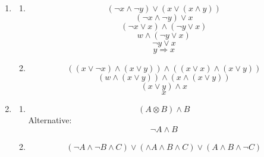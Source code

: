 \documentclass[a4paper]{article}
\begin{document}
\begin{enumerate}
		\item
		\begin{enumerate}
			\item
			\begin{equation*}
				(\lnot x \land \lnot y) \lor (x \lor (x \land y))
			\end{equation*}
			\begin{equation*}
				(\lnot x \land \lnot y) \lor x
			\end{equation*}
			\begin{equation*}
				(\lnot x \lor x) \land (\lnot y \lor x)
			\end{equation*}
			\begin{equation*}
				w \land (\lnot y \lor x)
			\end{equation*}
			\begin{equation*}
				\lnot y \lor x
			\end{equation*}
			\begin{equation*}
				y \Rightarrow x
			\end{equation*}
			
			\item
			\begin{equation*}
				((x \lor \lnot x) \land (x \lor y)) \land ((x \lor x) \land (x \lor y))
			\end{equation*}
			\begin{equation*}
				(w \land (x \lor y)) \land (x \land (x \lor y))
			\end{equation*}
			\begin{equation*}
				(x \lor y) \land x
			\end{equation*}
			\begin{equation*}
				x
			\end{equation*}
		\end{enumerate}
		
		\item
		\begin{enumerate}
			\item
			\begin{equation*}
				(A \otimes B) \land B
			\end{equation*}
			\newline
			Alternative:
			\begin{equation*}
				\lnot A \land B
			\end{equation*}
			
			\item
			\begin{equation*}
				(\lnot A \land \lnot B \land C) \lor (\land A \land B \land C) \lor (A \land B \land \lnot C)
			\end{equation*}
		\end{enumerate}
		\clearpage
		

\end{enumerate}
\end{document}
